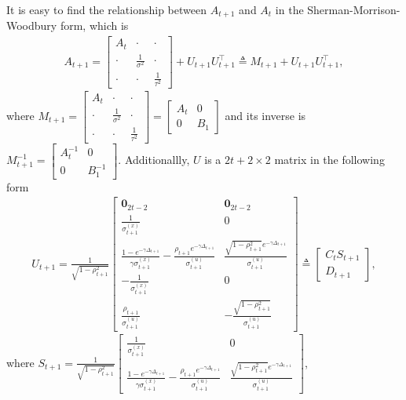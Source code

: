 It is easy to find the relationship between $A_{t+1}$ and  $A_{t}$ in the Sherman-Morrison-Woodbury form, which is 
\begin{align*} A_{t+1} = 
\begin{bmatrix}
A_t & \cdot & \cdot  \\ \cdot &\frac{1}{\sigma^2} &\cdot  \\ \cdot  & \cdot  & \frac{1}{\tau^2} 
\end{bmatrix} + U_{t+1}U_{t+1}^\top \triangleq M_{t+1}  + U_{t+1}U_{t+1}^\top,
\end{align*}
where $M_{t+1} = \begin{bmatrix}
A_t & \cdot & \cdot  \\ \cdot &\frac{1}{\sigma^2} &\cdot  \\ \cdot  & \cdot  & \frac{1}{\tau^2}
\end{bmatrix}  = \begin{bmatrix}
A_t & 0 \\ 0 & B_1
\end{bmatrix}$ 
and its inverse is $M_{t+1}^{-1} =\begin{bmatrix}
A_t^{-1} & 0 \\ 0 & B_1^{-1}
\end{bmatrix}$. Additionallly, $U$ is a $2t+2 \times 2$ matrix in the following form 
\begin{align*}
U_{t+1} = \frac{1}{\sqrt{ 1-\rho_{t+1}^2} } \begin{bmatrix}
\mathbf{0}_{2t-2} & \mathbf{0}_{2t-2}  \\ \frac{1}{\sigma_{t+1}^{(x)}}& 0 \\
\frac{1-e^{-\gamma \Delta_{t+1}}}{\gamma \sigma_{t+1}^{(x)}}-\frac{\rho_{t+1} e^{-\gamma\Delta_{t+1}}}{\sigma_{t+1}^{(u)}} & \frac{\sqrt{1-\rho_{t+1}^2}e^{-\gamma\Delta_{t+1}}}{\sigma_{t+1}^{(u)}} \\
-\frac{1}{\sigma_{t+1}^{(x)}} & 0 \\
\frac{\rho_{t+1}}{\sigma_{t+1}^{(u)}} & -\frac{\sqrt{1-\rho_{t+1}^2}}{\sigma_{t+1}^{(u)}}
\end{bmatrix} \triangleq  \begin{bmatrix}
C_t S_{t+1} \\ D_{t+1}
\end{bmatrix},
\end{align*}
where $S_{t+1} = \frac{1}{\sqrt{ 1-\rho_{t+1}^2} } \begin{bmatrix}
\frac{1}{\sigma_{t+1}^{(x)}}& 0 \\
\frac{1-e^{-\gamma \Delta_{t+1}}}{\gamma \sigma_{t+1}^{(x)}}-\frac{\rho_{t+1} e^{-\gamma\Delta_{t+1}}}{\sigma_{t+1}^{(u)}} & \frac{\sqrt{1-\rho_{t+1}^2}e^{-\gamma\Delta_{t+1}}}{\sigma_{t+1}^{(u)}}
\end{bmatrix}$,\\
